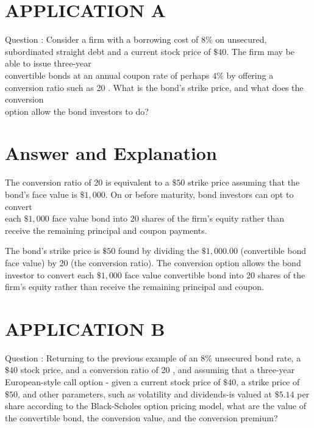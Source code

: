 \documentclass[11pt]{article}
\begin{document}
\section*{APPLICATION A}
Question : Consider a firm with a borrowing cost of $8 \%$ on unsecured, subordinated straight debt and a current stock price of $\$ 40$. The firm may be able to issue three-year\\
convertible bonds at an annual coupon rate of perhaps $4 \%$ by offering a conversion ratio such as 20 . What is the bond's strike price, and what does the conversion\\
option allow the bond investors to do?

\section*{Answer and Explanation}
The conversion ratio of 20 is equivalent to a $\$ 50$ strike price assuming that the bond's face value is $\$ 1,000$. On or before maturity, bond investors can opt to convert\\
each $\$ 1,000$ face value bond into 20 shares of the firm's equity rather than receive the remaining principal and coupon payments.

The bond's strike price is $\$ 50$ found by dividing the $\$ 1,000.00$ (convertible bond face value) by 20 (the conversion ratio). The conversion option allows the bond investor to convert each $\$ 1,000$ face value convertible bond into 20 shares of the firm's equity rather than receive the remaining principal and coupon.

\section*{APPLICATION B}
Question : Returning to the previous example of an $8 \%$ unsecured bond rate, a $\$ 40$ stock price, and a conversion ratio of 20 , and assuming that a three-year European-style call option - given a current stock price of $\$ 40$, a strike price of $\$ 50$, and other parameters, such as volatility and dividends-is valued at $\$ 5.14$ per share according to the Black-Scholes option pricing model, what are the value of the convertible bond, the conversion value, and the conversion premium?
\end{document}
